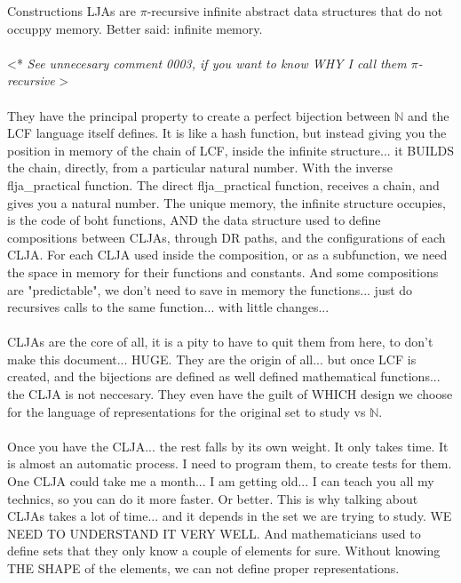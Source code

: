 		\noindent
		Constructions LJAs are $\pi$-recursive infinite abstract data structures that do not occuppy memory. Better said: infinite memory.
		\\\\
		
		\noindent
		\textless ** \textit{See unnecesary comment 0003, if you want to know WHY I call them $\pi$-recursive} \textgreater
		\\\\
		
		\noindent
		They have the principal property to create a perfect bijection between $\mathbb{N}$ and the LCF language itself defines. It is like a hash function, but instead giving you the position in memory of the chain of LCF, inside the infinite structure... it BUILDS the chain, directly, from a particular natural number. With the inverse flja\_practical function. The direct flja\_practical function, receives a chain, and gives you a natural number. The unique memory, the infinite structure occupies, is the code of boht functions, AND the data structure used to define compositions between CLJAs, through DR paths, and the configurations of each CLJA. For each CLJA used inside the composition, or as a subfunction, we need the space in memory for their functions and constants. And some compositions are "predictable", we don't need to save in memory the functions... just do recursives calls to the same function... with little changes...
		\\\\
		
		\noindent
		CLJAs are the core of all, it is a pity to have to quit them from here, to don't make this document... HUGE. They are the origin of all... but once LCF is created, and the bijections are defined as well defined mathematical functions... the CLJA is not neccesary. They even have the guilt of WHICH design we choose for the language of representations for the original set to study vs $\mathbb{N}$.
		\\\\
		
		\noindent
		Once you have the CLJA... the rest falls by its own weight. It only takes time. It is almost an automatic process. I need to program them, to create tests for them. One CLJA could take me a month... I am getting old... I can teach you all my technics, so you can do it more faster. Or better. This is why talking about CLJAs takes a lot of time... and it depends in the set we are trying to study. WE NEED TO UNDERSTAND IT VERY WELL. And mathematicians used to define sets that they only know a couple of elements for sure. Without knowing THE SHAPE of the elements, we can not define proper representations.
		\\\\
		
